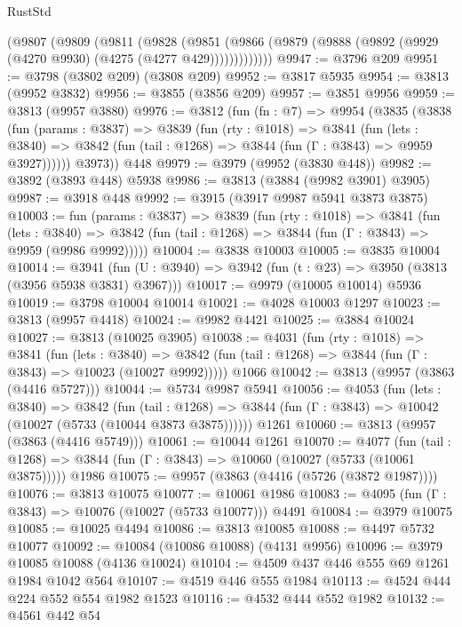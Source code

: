 \begin{lexlean}{RustStd}
\begin{coremodule}
{\begin{coremodule}
{{{{{{{{{{{{{{{{{{{{{{{{{{{{{{{{{{{      (@9807
        (@9809
          (@9811
            (@9828
              (@9851
                (@9866 (@9879 (@9888 (@9892 (@9929 (@4270 @9930) (@4275 (@4277 @429)))))))))))))
@9947 := @3796 @209
@9951 := @3798 (@3802 @209) (@3808 @209)
@9952 := @3817 @5935
@9954 := @3813 (@9952 @3832)
@9956 := @3855 (@3856 @209)
@9957 := @3851 @9956
@9959 := @3813 (@9957 @3880)
@9976 := @3812
    (fun (fn : @7) =>
    @9954
      (@3835
        (@3838
          (fun (params : @3837) =>
          @3839
            (fun (rty : @1018) =>
            @3841
              (fun (lets : @3840) =>
              @3842 (fun (tail : @1268) => @3844 (fun (Γ : @3843) => @9959 @3927))))))
        @3973))
    @448
@9979 := @3979 (@9952 (@3830 @448))
@9982 := @3892 (@3893 @448) @5938
@9986 := @3813 (@3884 (@9982 @3901) @3905)
@9987 := @3918 @448
@9992 := @3915 (@3917 @9987 @5941 @3873 @3875)
@10003 := fun (params : @3837) =>
  @3839
    (fun (rty : @1018) =>
    @3841
      (fun (lets : @3840) =>
      @3842 (fun (tail : @1268) => @3844 (fun (Γ : @3843) => @9959 (@9986 @9992)))))
@10004 := @3838 @10003
@10005 := @3835 @10004
@10014 := @3941
    (fun (U : @3940) => @3942 (fun (t : @23) => @3950 (@3813 (@3956 @5938 @3831) @3967)))
@10017 := @9979 (@10005 @10014) @5936
@10019 := @3798 @10004 @10014
@10021 := @4028 @10003 @1297
@10023 := @3813 (@9957 @4418)
@10024 := @9982 @4421
@10025 := @3884 @10024
@10027 := @3813 (@10025 @3905)
@10038 := @4031
    (fun (rty : @1018) =>
    @3841
      (fun (lets : @3840) =>
      @3842 (fun (tail : @1268) => @3844 (fun (Γ : @3843) => @10023 (@10027 @9992)))))
    @1066
@10042 := @3813 (@9957 (@3863 (@4416 @5727)))
@10044 := @5734 @9987 @5941
@10056 := @4053
    (fun (lets : @3840) =>
    @3842
      (fun (tail : @1268) =>
      @3844 (fun (Γ : @3843) => @10042 (@10027 (@5733 (@10044 @3873 @3875))))))
    @1261
@10060 := @3813 (@9957 (@3863 (@4416 @5749)))
@10061 := @10044 @1261
@10070 := @4077
    (fun (tail : @1268) => @3844 (fun (Γ : @3843) => @10060 (@10027 (@5733 (@10061 @3875)))))
    @1986
@10075 := @9957 (@3863 (@4416 (@5726 (@3872 @1987))))
@10076 := @3813 @10075
@10077 := @10061 @1986
@10083 := @4095 (fun (Γ : @3843) => @10076 (@10027 (@5733 @10077))) @4491
@10084 := @3979 @10075
@10085 := @10025 @4494
@10086 := @3813 @10085
@10088 := @4497 @5732 @10077
@10092 := @10084 (@10086 @10088) (@4131 @9956)
@10096 := @3979 @10085 @10088 (@4136 @10024)
@10104 := @4509 @437 @446 @555 @69 @1261 @1984 @1042 @564
@10107 := @4519 @446 @555 @1984
@10113 := @4524 @444 @224 @552 @554 @1982 @1523
@10116 := @4532 @444 @552 @1982
@10132 := @4561
    @442
    @54
}}}}}}}}}}}}}}}}}}}}}}}}}}}}}}}}}}}
\end{coremodule}}
\end{coremodule}
\end{lexlean}
